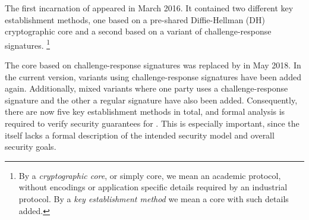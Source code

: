 \documentclass[runningheads, envcountsame, hidelinks, a4paper, draft, x11names]{llncs}
\begin{document}
%
The first incarnation of \mEdhoc{} appeared in March 2016.
%
It contained two different key establishment methods, one based on a
pre-shared Diffie-Hellman (DH) cryptographic core and a second based on a
variant of challenge-response signatures.%
%
\footnote{By a \emph{cryptographic core}, or simply core, we mean an academic protocol, without
encodings or application specific details required by an industrial protocol.
%
By a \emph{key establishment method} we mean a core with such details added.}
%

The core based on challenge-response signatures was replaced by \mSigma{}
in May 2018.
%
In the current version, variants using challenge-response signatures have been added again.
%
Additionally, mixed variants where one party uses a challenge-response
signature and the other a regular signature have also been added.
%
Consequently, there are now five key establishment methods in total, and formal analysis is 
required to verify security guarantees for \mEdhoc.
%
This is especially important, since the \mSpec{} itself lacks a formal description
of the intended security model and overall security goals.
%
\end{document}
